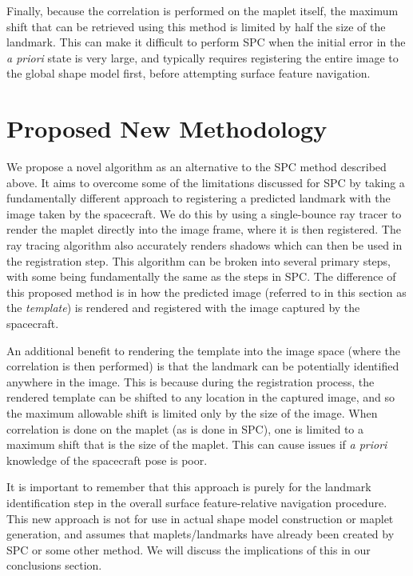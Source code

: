 \documentclass{RPI-SIW}
\begin{document}
Finally, because the correlation is performed on the maplet itself, the maximum shift that can be retrieved using this method is limited by half the size of the landmark.  
This can make it difficult to perform SPC when the initial error in the \textit{a priori} state is very large, and typically requires registering the entire image to the global shape model first, before attempting surface feature navigation.

\section*{Proposed New Methodology}
We propose a novel algorithm as an alternative to the SPC method described above.  It aims to overcome some of the limitations discussed for SPC by taking a fundamentally different approach to registering a predicted landmark with the image taken by the spacecraft.  We do this by using a single-bounce ray tracer to render the maplet directly into the image frame, where it is then registered.  The ray tracing algorithm also accurately renders shadows which can then be used in the registration step.  This algorithm can be broken into several primary steps, with some being fundamentally the same as the steps in SPC.  The difference of this proposed method is in how the predicted image (referred to in this section as the \textit{template}) is rendered and registered with the image captured by the spacecraft.

An additional benefit to rendering the template into the image space (where the correlation is then performed) is that the landmark can be potentially identified anywhere in the image.  This is because during the registration process, the rendered template can be shifted to any location in the captured image, and so the maximum allowable shift is limited only by the size of the image.  When correlation is done on the maplet (as is done in SPC), one is limited to a maximum shift that is the size of the maplet.  This can cause issues if \textit{a priori} knowledge of the spacecraft pose is poor.

It is important to remember that this approach is purely for the landmark identification step in the overall surface feature-relative navigation procedure.  This new approach is not for use in actual shape model construction or maplet generation, and assumes that maplets/landmarks have already been created by SPC or some other method.  We will discuss the implications of this in our conclusions section. 
\end{document}
